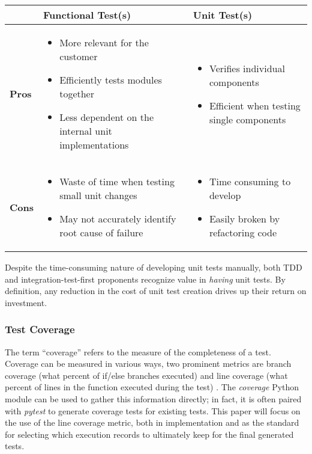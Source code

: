 \noindent\begin{tabular}{|>{\centering\arraybackslash}m{0.6cm}|>{\centering\arraybackslash}m{3.4cm}|>{\centering\arraybackslash}m{3.4cm}|}
    \hline
    \multirow{2}{*}{} & \textbf{Functional Test(s)} & \textbf{Unit Test(s)} \\
    \hline
    \textbf{Pros} & \begin{itemize}[leftmargin=*]
        \item More relevant for the customer
        \item Efficiently tests modules together
        \item Less dependent on the internal unit implementations
    \end{itemize} & \begin{itemize}[leftmargin=*]
        \item Verifies individual components
        \item Efficient when testing single components
    \end{itemize} \\
    \hline
    \textbf{Cons} & \begin{itemize}[leftmargin=*]
        \item Waste of time when testing small unit changes
        \item May not accurately identify root cause of failure
    \end{itemize} & \begin{itemize}[leftmargin=*]
        \item Time consuming to develop
        \item Easily broken by refactoring code
    \end{itemize} \\
    \hline
\end{tabular}
Despite the time-consuming nature of developing unit tests manually, both
TDD and integration-test-first proponents recognize value in \textit{having}
unit tests. By definition, any reduction in the cost of unit test creation drives 
up their return on investment.

\subsubsection{Test Coverage}\label{sec:intro-cov}
The term “coverage” refers to the measure of the completeness of a test.  
Coverage can be measured in various ways, two prominent metrics are branch coverage 
(what percent of if/else branches executed) and line coverage 
(what percent of lines in the function executed during the test) 
\cite{wang2024software}. The \textit{coverage} Python module can
be used to gather this information directly; in fact, it is often paired with 
\textit{pytest} to generate coverage tests for existing tests. This paper will focus 
on the use of the line coverage metric, both in implementation and 
as the standard for selecting which execution records to ultimately 
keep for the final generated tests.

